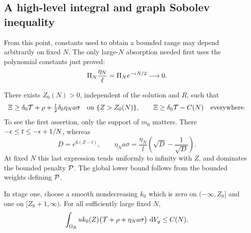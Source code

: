 \subsection{A high-level integral and graph Sobolev inequality}

From this point, constants used to obtain a bounded range may depend
arbitrarily on fixed $N$.  The only large-$N$ absorption needed first
uses the polynomial constants just proved:
\begin{equation}\label{four:bnd:small-boundary-factor}
 \Pi_N\frac{\eta_N}{\ell}
 =\Pi_N e^{-\epsilon N/2}\longrightarrow0.
\end{equation}

There exists $Z_0(N)>0$, independent of the solution and $R$, such
that
\begin{equation}\label{four:bnd:high-source}
 \Xi\ge\delta_0\mathcal T+\rho+\tfrac12\delta_0\eta_Na\sigma
       \quad\text{on }\{Z>Z_0(N)\},
 \qquad \Xi\ge\delta_0\mathcal T-C(N)\quad\text{everywhere}.
\end{equation}
To see the first assertion, only the support of $m_0$ matters.
There $-\epsilon\le t\le-\epsilon+1/N$, whereas
\[
 D=e^{6(Z-t)},\qquad
 \eta_Na\sigma=\frac{\eta_N}{l}
             \left(\sqrt D-\frac1{\sqrt D}\right).
\]
At fixed $N$ this last expression tends uniformly to infinity with
$Z$, and dominates the bounded penalty $\mathcal P$.  The global lower
bound follows from the bounded weights defining $\mathcal P$.

\begin{lemma}\label{four:bnd:high-level-integral}
In stage one, choose a smooth nondecreasing $k_0$ which is zero on
$(-\infty,Z_0]$ and one on $[Z_0+1,\infty)$.  For all sufficiently
large fixed $N$,
\begin{equation}\label{four:bnd:high-integral}
 \int_{\Omega_R}u k_0(Z)
       \bigl(\mathcal T+\rho+\eta_Na\sigma\bigr)\,\,\mathrm d V_g\le C(N).
\end{equation}
\end{lemma}


